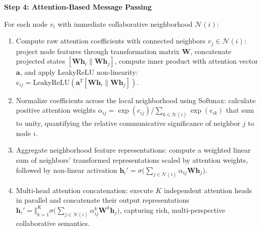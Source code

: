 \documentclass[11pt,a4paper]{article}
\begin{document}
\vspace{0.30em}
\textbf{Step 4: Attention-Based Message Passing}

For each node $v_i$ with immediate collaborative neighborhood $\mathcal{N}(i)$:
\begin{enumerate}[leftmargin=1.8em, itemsep=0.20em, topsep=0.05em]
    \item Compute raw attention coefficients with connected neighbors $v_j \in \mathcal{N}(i)$: project node features through transformation matrix $\mathbf{W}$, concatenate projected states $[\mathbf{W}\mathbf{h}_i \parallel \mathbf{W}\mathbf{h}_j]$, compute inner product with attention vector $\mathbf{a}$, and apply LeakyReLU non-linearity: $e_{ij} = \mathrm{LeakyReLU}(\mathbf{a}^T [\mathbf{W} \mathbf{h}_i \parallel \mathbf{W} \mathbf{h}_j])$.
    \item Normalize coefficients across the local neighborhood using Softmax: calculate positive attention weights $\alpha_{ij} = \exp(e_{ij}) / \sum_{k \in \mathcal{N}(i)} \exp(e_{ik})$ that sum to unity, quantifying the relative communicative significance of neighbor $j$ to node $i$.
    \item Aggregate neighborhood feature representations: compute a weighted linear sum of neighbors' transformed representations scaled by attention weights, followed by non-linear activation $\mathbf{h}_i' = \sigma\big(\sum_{j \in \mathcal{N}(i)} \alpha_{ij} \mathbf{W} \mathbf{h}_j\big)$.
    \item Multi-head attention concatenation: execute $K$ independent attention heads in parallel and concatenate their output representations $\mathbf{h}_i' = \Vert_{k=1}^K \sigma\big(\sum_{j \in \mathcal{N}(i)} \alpha_{ij}^k \mathbf{W}^k \mathbf{h}_j\big)$, capturing rich, multi-perspective collaborative semantics.
\end{enumerate}
\end{document}
